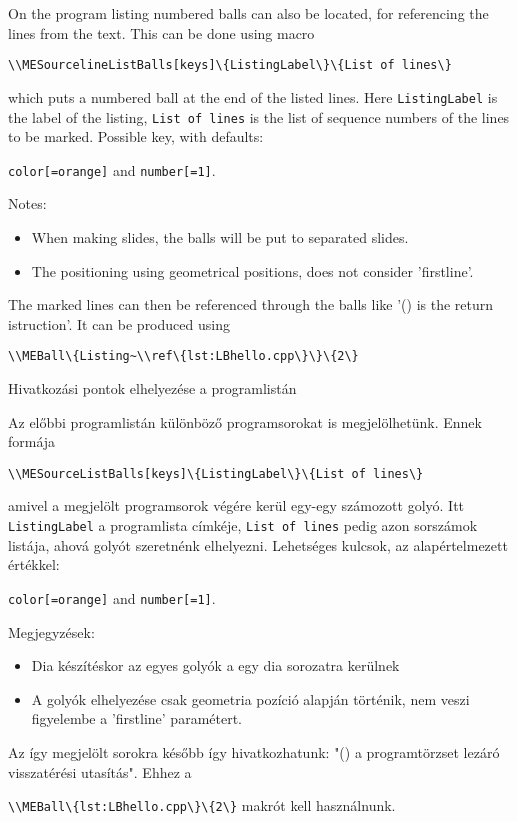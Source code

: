 {
On the program listing numbered balls can also be located, for referencing the 
lines from the text. This can be done using macro
\par\noindent\lstinline|\\MESourcelineListBalls[keys]\{ListingLabel\}\{List of lines\}|
\par\noindent which puts a numbered ball at the end of the listed lines.
Here \lstinline|ListingLabel| is the label of the listing, \lstinline|List of lines|
is the list of sequence numbers of the lines to be marked.
Possible key, with defaults:
\par\noindent\lstinline|color[=orange]| and \lstinline|number[=1]|. 


Notes:
\begin{itemize}
\item When making slides, the balls will be put to separated slides.
\item The positioning using geometrical positions, does not consider 'firstline'.
\end{itemize}

The marked lines can then be referenced through the balls like '()
is the return istruction'. It can be produced using 
\par\noindent\lstinline|\\MEBall\{Listing~\\ref\{lst:LBhello.cpp\}\}\{2\}|
}
{Hivatkozási pontok elhelyezése a programlistán}
{
Az előbbi programlistán különböző programsorokat is megjelölhetünk.
Ennek formája 
\par\noindent\lstinline|\\MESourceListBalls[keys]\{ListingLabel\}\{List of lines\}|
\par\noindent amivel a megjelölt programsorok végére kerül egy-egy számozott golyó.
Itt \lstinline|ListingLabel| a programlista címkéje, \lstinline|List of lines|
pedig azon sorszámok listája, ahová golyót szeretnénk elhelyezni.
Lehetséges kulcsok, az alapértelmezett értékkel:
\par\noindent\lstinline|color[=orange]| and \lstinline|number[=1]|. 


Megjegyzések:
\begin{itemize}
\item Dia készítéskor az egyes golyók a egy dia sorozatra kerülnek
\item A golyók elhelyezése csak geometria pozíció alapján történik, nem veszi figyelembe
a 'firstline' paramétert.
\end{itemize}


Az így megjelölt sorokra később így hivatkozhatunk: "()
a programtörzset lezáró visszatérési utasítás".
Ehhez a 
\par\noindent\lstinline|\\MEBall\{lst:LBhello.cpp\}\{2\}| makrót kell használnunk.

}

